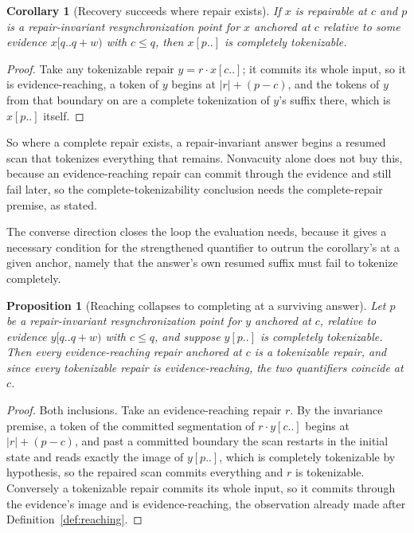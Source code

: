 \documentclass[11pt,a4paper]{article}
\theoremstyle{definition}
\theoremstyle{plain}
\newtheorem{corollary}{Corollary}
\newtheorem{proposition}{Proposition}
\theoremstyle{remark}
\newcommand{\suffix}[2]{#1[#2..]}
\newcommand{\window}[3]{#1[#2..#3)}
\begin{document}
\begin{corollary}[Recovery succeeds where repair exists]
If $x$ is repairable at $c$ and $p$ is a repair-invariant resynchronization point for $x$ anchored at $c$ relative to
some evidence $\window{x}{q}{q+w}$ with $c \le q$, then $\suffix{x}{p}$ is completely tokenizable.
\end{corollary}

\begin{proof}
Take any tokenizable repair $y = r \cdot \suffix{x}{c}$; it commits its whole input, so it is evidence-reaching, a token
of $y$ begins at $|r| + (p - c)$, and the tokens of $y$ from that boundary on are a complete tokenization of $y$'s
suffix there, which is $\suffix{x}{p}$ itself.
\end{proof}

So where a complete repair exists, a repair-invariant answer begins a resumed scan that tokenizes everything that
remains. Nonvacuity alone does not buy this, because an evidence-reaching repair can commit through the evidence and
still fail later, so the complete-tokenizability conclusion needs the complete-repair premise, as stated.

The converse direction closes the loop the evaluation needs, because it gives a necessary condition for the strengthened
quantifier to outrun the corollary's at a given anchor, namely that the answer's own resumed suffix must fail to
tokenize completely.

\begin{proposition}[Reaching collapses to completing at a surviving answer]
\label{prop:collapse}
Let $p$ be a repair-invariant resynchronization point for $y$ anchored at $c$, relative to evidence $\window{y}{q}{q+w}$
with $c \le q$, and suppose $\suffix{y}{p}$ is completely tokenizable. Then every evidence-reaching repair anchored at
$c$ is a tokenizable repair, and since every tokenizable repair is evidence-reaching, the two quantifiers coincide at
$c$.
\end{proposition}

\begin{proof}
Both inclusions. Take an evidence-reaching repair $r$. By the invariance premise, a token of the committed segmentation
of $r \cdot \suffix{y}{c}$ begins at $|r| + (p - c)$, and past a committed boundary the scan restarts in the initial
state and reads exactly the image of $\suffix{y}{p}$, which is completely tokenizable by hypothesis, so the repaired
scan commits everything and $r$ is tokenizable. Conversely a tokenizable repair commits its whole input, so it commits
through the evidence's image and is evidence-reaching, the observation already made after Definition~\ref{def:reaching}.
\end{proof}
\end{document}
